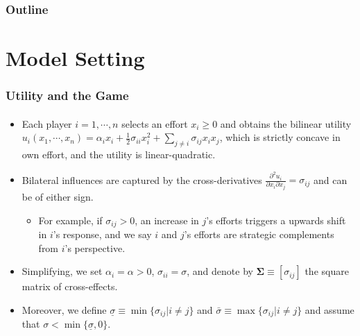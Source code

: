 \documentclass{beamer}
\newcommand{\hl}[1]{\textcolor{myblue}{#1}}
\newcommand{\lb}[1]{\underline{#1}}
\newcommand{\lbs}{\lb{\sigma}}
\newcommand{\ubs}{\bar{\sigma}}
\begin{document}
\begin{frame}
    \frametitle{Outline}
    \tableofcontents[hideallsubsections]
\end{frame} 

\section{Model Setting} 
\begin{frame}%
    \frametitle{Utility and the Game}
    \framesubtitle{}
    \begin{itemize}
        \item Each player $i=1,\cdots,n$ selects an effort $x_i\geq0$ and obtains the bilinear
            utility $u_i(x_1,\cdots,x_n)=\alpha_ix_i+\frac{1}{2}\sigma_{ii}x_i^2+
            \sum_{j\neq i}\sigma_{ij}x_ix_j$, which is strictly concave in own effort, and the
            utility is linear-quadratic.
        \item Bilateral influences are captured by the cross-derivatives 
            $\frac{\partial^2 {u_i}}{\partial {x_i}\partial {x_j}}=\sigma_{ij}$ and can be of either
            sign. 
            \begin{itemize}
                \item For example, if $\sigma_{ij}>0$, an increase in $j$'s efforts triggers
                    a upwards shift \hl{in $i$'s response}, and we say $i$ and $j$'s efforts
                    are \hl{strategic complements from $i$'s perspective}.
            \end{itemize}
        \item Simplifying, we set $\alpha_i=\alpha>0$, $\sigma_{ii}=\sigma$, and 
            denote by $\bm{\Sigma}\equiv[\sigma_{ij}]$ the square matrix of cross-effects.
        \item Moreover, we define $\lbs\equiv\min\{\sigma_{ij}|i\neq j\}$ and 
            $\ubs\equiv\max\{\sigma_{ij}|i\neq j\}$ and assume that
            $\sigma<\min\{\lbs,0\}$.
    \end{itemize}
\end{frame}
\end{document}
